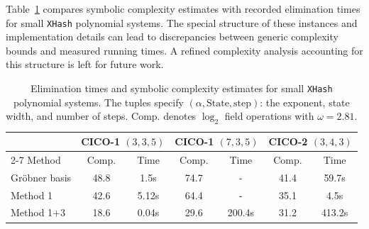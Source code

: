 Table~\ref{tab:xhash_experimental} compares symbolic complexity estimates with recorded elimination times for small \texttt{XHash} polynomial systems. The special structure of these instances and implementation details can lead to discrepancies between generic complexity bounds and measured running times. A refined complexity analysis accounting for this structure is left for future work.

\begin{table}[!htbp]
\centering
\caption{Elimination times and symbolic complexity estimates for small \texttt{XHash} polynomial systems. The tuples specify $(\alpha,\mathrm{State},\mathrm{step})$: the exponent, state width, and number of steps. Comp. denotes $\log_2$ field operations with $\omega=2.81$.}
\label{tab:xhash_experimental}
\begin{tabular}{l|cc|cc|cc}
\toprule
 & \multicolumn{2}{c|}{CICO-1 $(3,3,5)$} & \multicolumn{2}{c|}{CICO-1 $(7,3,5)$} & \multicolumn{2}{c}{CICO-2 $(3,4,3)$} \\
\cmidrule{2-7}
Method & Comp. & Time & Comp. & Time & Comp. & Time \\
\midrule
Gr\"obner basis & 48.8 & 1.5s & 74.7 & - & 41.4 & 59.7s \\
Method 1 & 42.6 & 5.12s & 64.4 & - & 35.1 & 4.5s \\
Method 1+3 & 18.6 & 0.04s & 29.6 & 200.4s & 31.2 & 413.2s \\
\bottomrule
\end{tabular}
\end{table}
